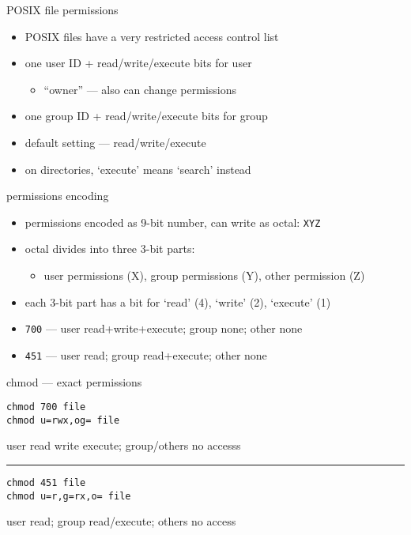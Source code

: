 \begin{frame}{POSIX file permissions}
    \begin{itemize}
    \item POSIX files have a very restricted access control list
    \vspace{.5cm}
    \item one user ID + read/write/execute bits for user
        \begin{itemize}
        \item ``owner'' --- also can change permissions
        \end{itemize}
    \item one group ID + read/write/execute bits for group
    \item default setting --- read/write/execute
    \vspace{.5cm}
    \item on directories, `execute' means `search' instead
    \end{itemize}
\end{frame}

\begin{frame}{permissions encoding}
\begin{itemize}
    \item permissions encoded as 9-bit number, can write as octal: \texttt{XYZ}
    \item octal divides into three 3-bit parts:
        \begin{itemize}
        \item user permissions (X), group permissions (Y), other permission (Z)
        \end{itemize}
    \item each 3-bit part has a bit for `read' (4), `write' (2), `execute' (1)
    \vspace{.5cm}
    \item \texttt{700} --- user read+write+execute; group none; other none
    \item \texttt{451} --- user read; group read+execute; other none
\end{itemize}
\end{frame}

\begin{frame}[fragile]{chmod --- exact permissions}
\begin{Verbatim}
chmod 700 file
chmod u=rwx,og= file
\end{Verbatim}
user read write execute; group/others no accesss
    \vspace{.1cm}
\hrule
\begin{Verbatim}
chmod 451 file
chmod u=r,g=rx,o= file
\end{Verbatim}
user read; group read/execute; others no access
\end{frame}

